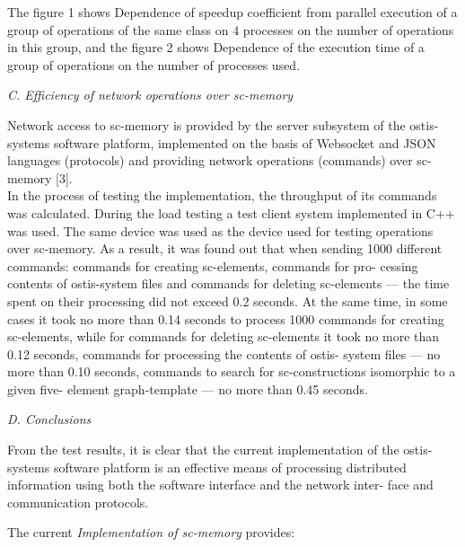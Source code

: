 ﻿\documentclass[a4paper]{article}
\begin{document}
\begin{multicols}{2}
The figure 1 shows Dependence of speedup coefficient
from parallel execution of a group of operations of the
same class on 4 processes on the number of operations
in this group, and the figure 2 shows Dependence of the
execution time of a group of operations on the number
of processes used.\\
\begin{description}
    \item [\textnormal{\textit{C. Efficiency of network operations over sc-memory}}]
\end{description} \par
Network access to sc-memory is provided by the
server subsystem of the ostis-systems software platform,
implemented on the basis of Websocket and JSON
languages (protocols) and providing network operations
(commands) over sc-memory [3].\\
In the process of testing the implementation, the
throughput of its commands was calculated. During the
load testing a test client system implemented in C++ was
used. The same device was used as the device used for
testing operations over sc-memory. As a result, it was
found out that when sending 1000 different commands:
commands for creating sc-elements, commands for pro-
cessing contents of ostis-system files and commands for
deleting sc-elements — the time spent on their processing
did not exceed 0.2 seconds. At the same time, in some
cases it took no more than 0.14 seconds to process 1000
commands for creating sc-elements, while for commands
for deleting sc-elements it took no more than 0.12
seconds, commands for processing the contents of ostis-
system files — no more than 0.10 seconds, commands
to search for sc-constructions isomorphic to a given five-
element graph-template — no more than 0.45 seconds.\\
    \begin{description}
       \item[\textnormal{\textit{D. Conclusions}}]
    \end{description} \par
From the test results, it is clear that the current
implementation of the ostis-systems software platform is
an effective means of processing distributed information
using both the software interface and the network inter-
face and communication protocols.

 The current \textit{Implementation of sc-memory} provides:
 
\begin{itemize}


\end{itemize}
\end{multicols}
\end{document}
